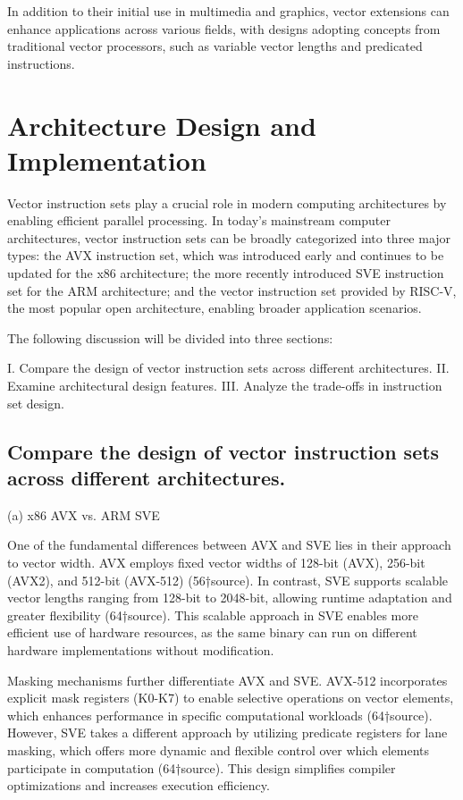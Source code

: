 \documentclass[conference]{IEEEtran}
\begin{document}
In addition to their initial use in multimedia and graphics, vector extensions can enhance applications across various fields, with designs adopting concepts from traditional vector processors, such as variable vector lengths and predicated instructions.


\section{Architecture Design and Implementation}
Vector instruction sets play a crucial role in modern computing architectures by 
enabling efficient parallel processing. In today's mainstream computer architectures, 
vector instruction sets can be broadly categorized into three major types: 
the AVX instruction set, which was introduced early and continues to be updated 
for the x86 architecture; the more recently introduced SVE instruction set for the ARM architecture; 
and the vector instruction set provided by RISC-V, the most popular open architecture, 
enabling broader application scenarios.

The following discussion will be divided into three sections:

I. Compare the design of vector instruction sets across different architectures.
II. Examine architectural design features.
III. Analyze the trade-offs in instruction set design.


\subsection{Compare the design of vector instruction sets across different architectures.}
(a) x86 AVX vs. ARM SVE

One of the fundamental differences between AVX and SVE lies in their approach to vector width. 
AVX employs fixed vector widths of 128-bit (AVX), 256-bit (AVX2), and 512-bit (AVX-512) (56†source). 
In contrast, SVE supports scalable vector lengths ranging from 128-bit to 2048-bit, 
allowing runtime adaptation and greater flexibility (64†source). 
This scalable approach in SVE enables more efficient use of hardware resources, as the same binary 
can run on different hardware implementations without modification.

Masking mechanisms further differentiate AVX and SVE. AVX-512 incorporates explicit mask registers (K0-K7) to enable selective operations on vector elements, which enhances performance in specific computational workloads (64†source). However, SVE takes a different approach by utilizing predicate registers for lane masking, which offers more dynamic and flexible control over which elements participate in computation (64†source). This design simplifies compiler optimizations and increases execution efficiency.
\end{document}
